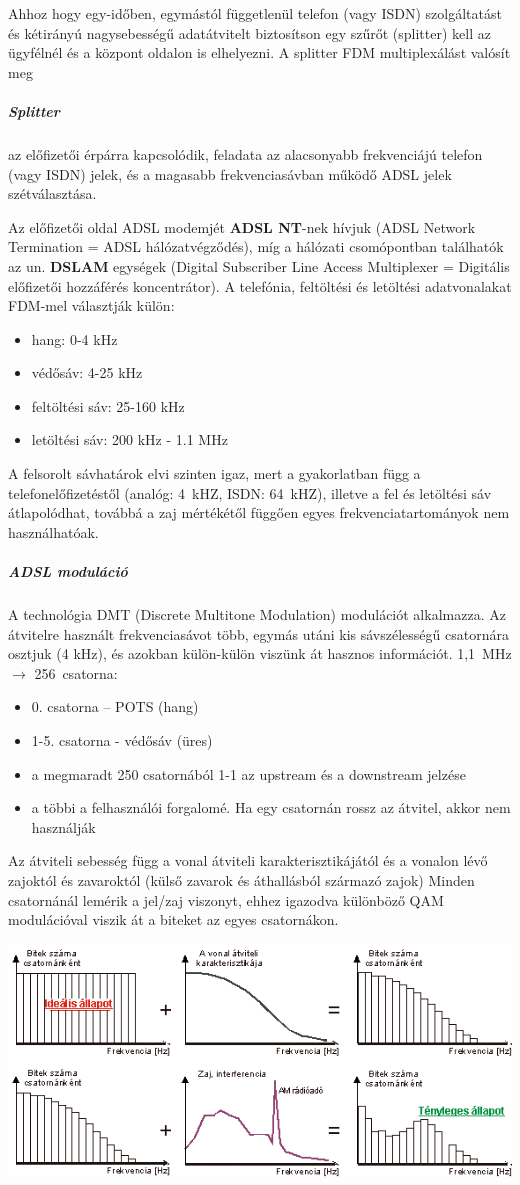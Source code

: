 Ahhoz hogy egy-időben, egymástól függetlenül telefon (vagy ISDN) szolgáltatást és kétirányú nagysebességű adatátvitelt biztosítson egy szűrőt (splitter) kell az ügyfélnél és a központ oldalon is elhelyezni. A splitter FDM multiplexálást valósít meg
\subparagraph{Splitter} az előfizetői érpárra kapcsolódik, feladata az alacsonyabb frekvenciájú telefon (vagy ISDN) jelek, és a magasabb frekvenciasávban működő ADSL jelek szétválasztása.

Az előfizetői oldal ADSL modemjét \textbf{ADSL NT}-nek hívjuk (ADSL Network Termination = ADSL hálózatvégződés), míg a hálózati csomópontban találhatók az un. \textbf{DSLAM} egységek (Digital Subscriber Line Access Multiplexer = Digitális előfizetői hozzáférés koncentrátor). A telefónia, feltöltési és letöltési adatvonalakat FDM-mel választják külön:
\begin{itemize}[nosep]
	\item hang: 0-4 kHz
	\item védősáv: 4-25 kHz
	\item feltöltési sáv: 25-160 kHz
	\item letöltési sáv: 200 kHz - 1.1 MHz
\end{itemize}
A felsorolt sávhatárok elvi szinten igaz, mert a gyakorlatban függ a telefonelőfizetéstől (analóg: 4~kHZ, ISDN: 64~kHZ), illetve a fel és letöltési sáv átlapolódhat, továbbá a zaj mértékétől függően egyes frekvenciatartományok nem használhatóak.

\subparagraph{ADSL moduláció} A technológia DMT (Discrete Multitone Modulation) modulációt alkalmazza. Az átvitelre használt frekvenciasávot több, egymás utáni kis sávszélességű csatornára osztjuk (4 kHz), és azokban külön-külön viszünk át hasznos információt. 1,1~MHz $\rightarrow$ 256~csatorna:
\begin{itemize}[nosep]
	\item 0. csatorna -- POTS (hang)
	\item 1-5. csatorna - védősáv (üres)
	\item a megmaradt 250 csatornából 1-1 az upstream és a downstream jelzése
	\item a többi a felhasználói forgalomé. Ha egy csatornán rossz az átvitel, akkor nem használják
\end{itemize}
Az átviteli sebesség függ a vonal átviteli karakterisztikájától és a vonalon lévő zajoktól és zavaroktól (külső zavarok és áthallásból származó zajok)
Minden csatornánál lemérik a jel/zaj viszonyt, ehhez igazodva különböző QAM modulációval viszik át a biteket az egyes csatornákon.
\begin{center}
	\includegraphics[width=0.7\linewidth]{fig/12-DMT}
\end{center}
